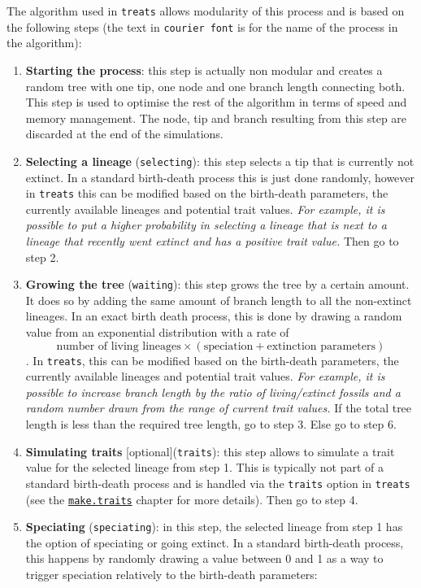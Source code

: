 \documentclass[
]{book}
\providecommand{\tightlist}{%
  \setlength{\itemsep}{0pt}\setlength{\parskip}{0pt}}
\begin{document}
The algorithm used in \texttt{treats} allows modularity of this process and is based on the following steps (the text in \texttt{courier\ font} is for the name of the process in the algorithm):

\begin{enumerate}
\def\labelenumi{\arabic{enumi}.}
\setcounter{enumi}{-1}
\tightlist
\item
  \textbf{Starting the process}: this step is actually non modular and creates a random tree with one tip, one node and one branch length connecting both. This step is used to optimise the rest of the algorithm in terms of speed and memory management. The node, tip and branch resulting from this step are discarded at the end of the simulations.
\item
  \textbf{Selecting a lineage} (\texttt{selecting}): this step selects a tip that is currently not extinct. In a standard birth-death process this is just done randomly, however in \texttt{treats} this can be modified based on the birth-death parameters, the currently available lineages and potential trait values. \emph{For example, it is possible to put a higher probability in selecting a lineage that is next to a lineage that recently went extinct and has a positive trait value.}
  Then go to step 2.
\item
  \textbf{Growing the tree} (\texttt{waiting}): this step grows the tree by a certain amount. It does so by adding the same amount of branch length to all the non-extinct lineages. In an exact birth death process, this is done by drawing a random value from an exponential distribution with a rate of \[\text{number of living lineages} \times (\text{speciation} + \text{extinction parameters})\]. In \texttt{treats}, this can be modified based on the birth-death parameters, the currently available lineages and potential trait values. \emph{For example, it is possible to increase branch length by the ratio of living/extinct fossils and a random number drawn from the range of current trait values.}
  If the total tree length is less than the required tree length, go to step 3. Else go to step 6.
\item
  \textbf{Simulating traits} {[}optional{]}(\texttt{traits}): this step allows to simulate a trait value for the selected lineage from step 1. This is typically not part of a standard birth-death process and is handled via the \texttt{traits} option in \texttt{treats} (see the \protect\hyperlink{maketraits}{\texttt{make.traits}} chapter for more details).
  Then go to step 4.
\item
  \textbf{Speciating} (\texttt{speciating}): in this step, the selected lineage from step 1 has the option of speciating or going extinct. In a standard birth-death process, this happens by randomly drawing a value between 0 and 1 as a way to trigger speciation relatively to the birth-death parameters:
\end{enumerate}
\end{document}
